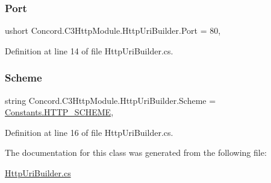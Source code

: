 \subsubsection{\texorpdfstring{Port}{Port}}
{\footnotesize\ttfamily ushort Concord.\+C3\+Http\+Module.\+Http\+Uri\+Builder.\+Port = 80\hspace{0.3cm}{\ttfamily [get]}, {\ttfamily [set]}}



Definition at line 14 of file Http\+Uri\+Builder.\+cs.

\mbox{\label{class_concord_1_1_c3_http_module_1_1_http_uri_builder_aec68ef1c873d7894850552ee9067119a}} 
\subsubsection{\texorpdfstring{Scheme}{Scheme}}
{\footnotesize\ttfamily string Concord.\+C3\+Http\+Module.\+Http\+Uri\+Builder.\+Scheme = \mbox{\hyperlink{class_concord_1_1_c3_http_module_1_1_constants_ad5d0cf769b25bef58e712036c67b915b}{Constants.\+H\+T\+T\+P\+\_\+\+S\+C\+H\+E\+ME}}\hspace{0.3cm}{\ttfamily [get]}, {\ttfamily [set]}}



Definition at line 16 of file Http\+Uri\+Builder.\+cs.



The documentation for this class was generated from the following file\+:\begin{DoxyCompactItemize}
\item 
\mbox{\hyperlink{_http_uri_builder_8cs}{Http\+Uri\+Builder.\+cs}}\end{DoxyCompactItemize}
